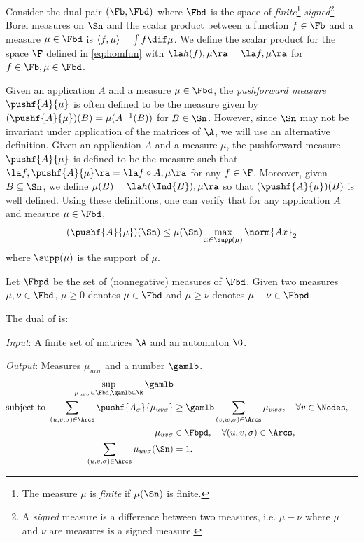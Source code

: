 \documentclass[11pt,twoside,a4paper,openright]{uclouvain-thesis}
\begin{document}
Consider the dual pair $(\Fb, \Fbd)$ where $\Fbd$ is the space of \emph{finite}\footnote{The measure $\mu$ is \emph{finite} if $\mu(\Sn)$ is finite.} \emph{signed}\footnote{A \emph{signed} measure is a difference between two measures, i.e. $\mu - \nu$ where $\mu$ and $\nu$ are measures is a signed measure.} Borel measures on $\Sn$ and the scalar product between a function $f \in \Fb$ and a measure $\mu \in \Fbd$ is $\langle f, \mu \rangle = \int f \dif \mu$.
We define the scalar product for the space $\F$ defined in \eqref{eq:homfun} with $\la h(f), \mu \ra = \la f, \mu \ra$ for $f \in \Fb, \mu \in \Fbd$.

Given an application $A$ and a measure $\mu \in \Fbd$,
the \emph{pushforward measure} $\pushf{A}{\mu}$ is often defined to be the measure given by
$(\pushf{A}{\mu})(B) = \mu(A^{-1}(B))$ for $B \in \Sn$.
However, since $\Sn$ may not be invariant under application of the matrices of $\A$,
we will use an alternative definition.
Given an application $A$ and a measure $\mu$,
the pushforward measure $\pushf{A}{\mu}$ is defined to be the measure such that
$\la f, \pushf{A}{\mu} \ra = \la f \circ A, \mu \ra$ for any $f \in \F$.
Moreover, given $B \subseteq \Sn$, we define $\mu(B) = \la h(\Ind{B}), \mu \ra$
so that $(\pushf{A}{\mu})(B)$ is well defined.
Using these definitions, one can verify that for any application $A$ and measure $\mu \in \Fbd$,
\begin{equation}
  \label{eq:pushfineq}
  (\pushf{A}{\mu})(\Sn) \leq \mu(\Sn)
  \max_{x \in \supp(\mu)} \norm{Ax}_2
\end{equation}
where $\supp(\mu)$ is the support of $\mu$.

Let $\Fbpd$ be the set of (nonnegative) measures of $\Fbd$.
Given two measures $\mu, \nu \in \Fbd$, $\mu \geq 0$ denotes $\mu \in \Fbd$ and $\mu \geq \nu$ denotes $\mu - \nu \in \Fbpd$.

The dual of  is:
\begin{myprog}
  \label{prog:dualinf}

  \emph{Input}: A finite set of matrices $\A$ and an automaton $\G$.

  \emph{Output}: Measures $\mu_{uv\sigma}$ and a number $\gamlb$.
  \begin{align}
    \notag
    \sup_{\mu_{uv\sigma} \in \Fbd, \gamlb \in \R} \gamlb\\
    \label{eq:dualinf1}
    \text{subject to }\sum_{(u,v,\sigma) \in \Arcs} \pushf{A_{\sigma}}{\mu_{uv\sigma}} & \geq \gamlb \sum_{(v,w,\sigma) \in \Arcs} \mu_{vw\sigma}, \quad \forall v \in \Nodes,\\
    \notag
    \mu_{uv\sigma} & \in \Fbpd, \quad \forall (u, v, \sigma) \in \Arcs,\\
    \label{eq:dualinf3}
    \sum_{(u,v,\sigma) \in \Arcs} \mu_{uv\sigma}(\Sn) & = 1.
  \end{align}
\end{myprog}
\end{document}
